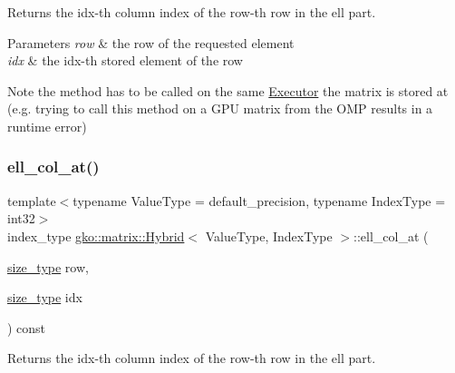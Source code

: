 Returns the {\ttfamily idx}-\/th column index of the {\ttfamily row}-\/th row in the ell part. 


\begin{DoxyParams}{Parameters}
{\em row} & the row of the requested element \\
\hline
{\em idx} & the idx-\/th stored element of the row\\
\hline
\end{DoxyParams}
\begin{DoxyNote}{Note}
the method has to be called on the same \hyperlink{classgko_1_1Executor}{Executor} the matrix is stored at (e.\+g. trying to call this method on a G\+PU matrix from the O\+MP results in a runtime error) 
\end{DoxyNote}
\mbox{\label{classgko_1_1matrix_1_1Hybrid_a3a2d9b00dd8b2333b05a97d968dfabff}} 
\subsubsection{\texorpdfstring{ell\+\_\+col\+\_\+at()}{ell\_col\_at()}\hspace{0.1cm}{\footnotesize\ttfamily [2/2]}}
{\footnotesize\ttfamily template$<$typename Value\+Type = default\+\_\+precision, typename Index\+Type = int32$>$ \\
index\+\_\+type \hyperlink{classgko_1_1matrix_1_1Hybrid}{gko\+::matrix\+::\+Hybrid}$<$ Value\+Type, Index\+Type $>$\+::ell\+\_\+col\+\_\+at (\begin{DoxyParamCaption}\item[{\hyperlink{namespacegko_a6e5c95df0ae4e47aab2f604a22d98ee7}{size\+\_\+type}}]{row,  }\item[{\hyperlink{namespacegko_a6e5c95df0ae4e47aab2f604a22d98ee7}{size\+\_\+type}}]{idx }\end{DoxyParamCaption}) const\hspace{0.3cm}{\ttfamily [noexcept]}}



Returns the {\ttfamily idx}-\/th column index of the {\ttfamily row}-\/th row in the ell part. 


